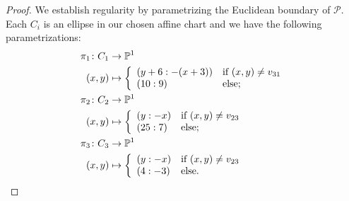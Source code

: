 \documentclass[a4paper,10pt]{amsart}
\theoremstyle{definition}
\theoremstyle{plain}
\newcommand{\cP}{{\mathcal P}}
\newcommand{\pp}{\mathbb{P}}
\begin{document}
\begin{proof}
 We establish regularity by parametrizing the Euclidean boundary of $\cP$. Each $C_i$ is an ellipse in our chosen affine chart and we have the following parametrizations:
 \begin{align*}
     \pi_1 \colon C_1 &\to \pp^1 \\
     (x,y) &\mapsto \left\lbrace \begin{array}{ll}
         (y+6 : -(x+3)) & \textup{if } (x,y) \neq v_{31} \\
         (10 : 9) & \textup{else};
     \end{array} \right. \\
     \pi_2 \colon C_2 &\to \pp^1 \\
     (x,y) &\mapsto \left\lbrace \begin{array}{ll}
         (y : -x) & \textup{if } (x,y) \neq v_{23} \\
         (25 : 7) & \textup{else};
     \end{array} \right. \\
     \pi_3 \colon C_3 &\to \pp^1 \\
     (x,y) &\mapsto \left\lbrace \begin{array}{ll}
         (y : -x) & \textup{if } (x,y) \neq v_{23} \\
         (4 : -3) & \textup{else}.
     \end{array} \right.
 \end{align*}


\end{proof}
\end{document}
